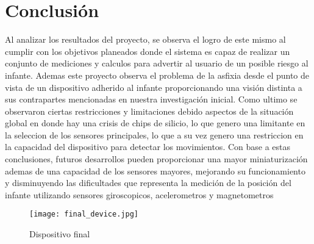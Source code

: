 \section{Conclusión}
Al analizar los resultados del proyecto, se observa el logro de este mismo al 
cumplir con los objetivos planeados donde el sistema es capaz de realizar un 
conjunto de mediciones y calculos para advertir al usuario de un posible riesgo al infante.
Ademas este proyecto observa el problema de la asfixia desde el punto de vista de un 
dispositivo adherido al infante proporcionando una visión distinta a sus contrapartes 
mencionadas en nuestra investigación inicial.
Como ultimo se observaron ciertas restricciones y limitaciones debido aspectos 
de la situación global en donde hay una crisis de chips de silicio, lo que genero 
una limitante en la seleccion de los sensores principales, lo que a su vez genero 
una restriccion en la capacidad del dispositivo para detectar los movimientos.
Con base a estas conclusiones, futuros desarrollos pueden proporcionar una mayor 
miniaturización ademas de una capacidad de los sensores mayores, mejorando su 
funcionamiento y disminuyendo las dificultades que representa la medición de la
posición del infante utilizando sensores giroscopicos, acelerometros y magnetometros

\begin{figure}[htp!]
    \centering
    \texttt{[image: final\_device.jpg]}
    \caption{Dispositivo final}
    \label{fig: final_device}
\end{figure}
\FloatBarrier